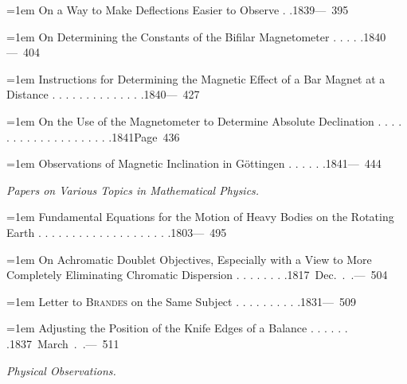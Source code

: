 \noindent\hangindent=1em On a Way to Make Deflections Easier to Observe . .\unskip\hspace{1em plus 1fill}\mbox{1839\quad — 395}\par\smallskip
\noindent\hangindent=1em On Determining the Constants of the Bifilar Magnetometer . . . . .\unskip\hspace{1em plus 1fill}\mbox{1840\quad — 404}\par\smallskip
\noindent\hangindent=1em Instructions for Determining the Magnetic Effect of a Bar Magnet at a Distance . . . . . . . . . . . . . .\unskip\hspace{1em plus 1fill}\mbox{1840\quad — 427}\par\smallskip
{}
\noindent\hangindent=1em On the Use of the Magnetometer to Determine Absolute Declination . . . . . . . . . . . . . . . . . . . .\unskip\hspace{1em plus 1fill}\mbox{1841\quad Page 436}\par\smallskip
\noindent\hangindent=1em Observations of Magnetic Inclination in Göttingen . . . . . .\unskip\hspace{1em plus 1fill}\mbox{1841\quad — 444}\par\smallskip
\par{}\medskip\noindent\textit{Papers on Various Topics in Mathematical Physics.}\par\smallskip
\noindent\hangindent=1em Fundamental Equations for the Motion of Heavy Bodies on the Rotating Earth . . . . . . . . . . . . . . . . . . . .\unskip\hspace{1em plus 1fill}\mbox{1803\quad — 495}\par\smallskip
\noindent\hangindent=1em On Achromatic Doublet Objectives, Especially with a View to More Completely Eliminating Chromatic Dispersion . . . . . . . .\unskip\hspace{1em plus 1fill}\mbox{1817 Dec. . .\quad — 504}\par\smallskip
\noindent\hangindent=1em Letter to \textsc{Brandes} on the Same Subject . . . . . . . . . .\unskip\hspace{1em plus 1fill}\mbox{1831\quad — 509}\par\smallskip
\noindent\hangindent=1em Adjusting the Position of the Knife Edges of a Balance . . . . . . .\unskip\hspace{1em plus 1fill}\mbox{1837 March . .\quad — 511}\par\smallskip
\par{}\medskip\noindent\textit{Physical Observations.}\par\smallskip
